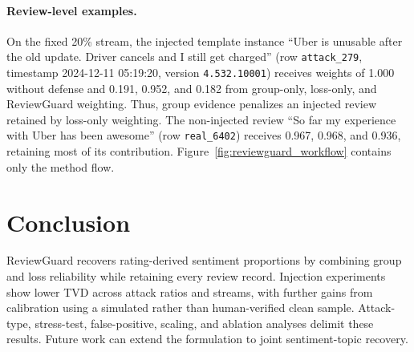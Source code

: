 \documentclass[runningheads]{llncs}
\begin{document}
\paragraph{Review-level examples.}
On the fixed 20\% stream, the injected template instance ``Uber is unusable after the old update. Driver cancels and I still get charged'' (row \texttt{attack\_279}, timestamp 2024-12-11 05:19:20, version \texttt{4.532.10001}) receives weights of 1.000 without defense and 0.191, 0.952, and 0.182 from group-only, loss-only, and ReviewGuard weighting. Thus, group evidence penalizes an injected review retained by loss-only weighting. The non-injected review ``So far my experience with Uber has been awesome'' (row \texttt{real\_6402}) receives 0.967, 0.968, and 0.936, retaining most of its contribution. Figure~\ref{fig:reviewguard_workflow} contains only the method flow.

\section{Conclusion}

ReviewGuard recovers rating-derived sentiment proportions by combining group and loss reliability while retaining every review record. Injection experiments show lower TVD across attack ratios and streams, with further gains from calibration using a simulated rather than human-verified clean sample. Attack-type, stress-test, false-positive, scaling, and ablation analyses delimit these results. Future work can extend the formulation to joint sentiment-topic recovery.



\end{document}

